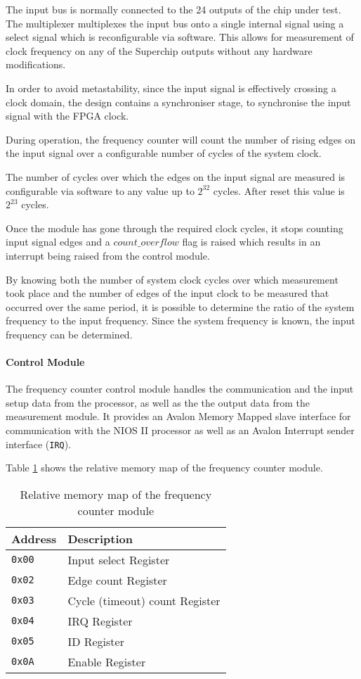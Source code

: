 The input bus is normally connected to the 24 outputs of the chip under test. The
multiplexer multiplexes the input bus onto a single internal signal using a select signal
which is reconfigurable via software. This allows for measurement of clock frequency
on any of the Superchip outputs without any hardware modifications.

In order to avoid metastability, since the input signal is effectively crossing a
clock domain, the design contains a synchroniser stage, to synchronise the input signal
with the FPGA clock.

During operation, the frequency counter will count the number of rising edges on the
input signal over a configurable number of cycles of the system clock.

The number of cycles over which
the edges on the input signal are measured is configurable via software to any value up
to $2^{32}$ cycles. After reset this value is $2^{23}$ cycles.

Once the module has gone through the required clock cycles, it stops counting input signal
edges and a $count\_overflow$ flag is raised which results in an interrupt being raised
from the control module.

By knowing both the number of system clock cycles over which measurement took place
and the number of edges of the input clock to be measured that occurred over the same
period, it is possible to determine the ratio of the system frequency to the input
frequency. Since the system frequency is known, the input frequency can be determined.


\paragraph{Control Module}
The frequency counter control module handles the communication and the input setup
data from the processor, as well as the the output data from the measurement module.
It provides an Avalon Memory Mapped slave interface for communication with the
NIOS II processor as well as an Avalon Interrupt sender interface (\texttt{IRQ}).

Table \ref{table:fcounter_memorymap} shows the relative memory map of the frequency
counter module.


\begin{table}[h!]
\centering
\begin{tabular}{ | l | l | }
 \hline
   Address       & Description \\
 \hline
   \texttt{0x00} & Input select Register \\
 \hline
   \texttt{0x02} & Edge count Register \\
 \hline
   \texttt{0x03} & Cycle (timeout) count Register \\
 \hline
   \texttt{0x04} & IRQ Register \\
 \hline
   \texttt{0x05} & ID Register \\
 \hline
   \texttt{0x0A} & Enable Register \\
 \hline
\end{tabular}
\caption{Relative memory map of the frequency counter module}
\label{table:fcounter_memorymap}
\end{table}



